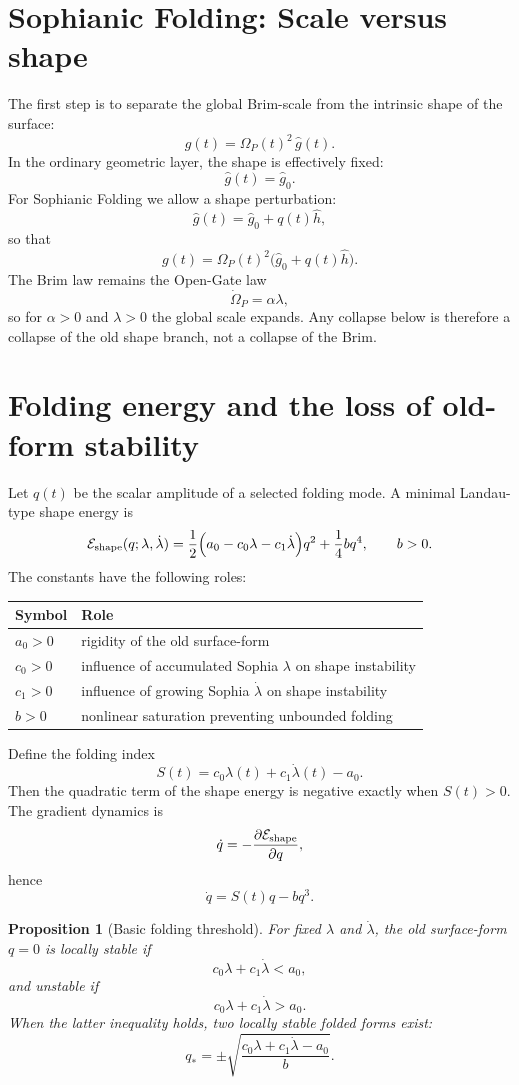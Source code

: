 \documentclass[11pt,a4paper]{article}
\newcommand{\Op}{\Omega_P}
\theoremstyle{plain}
\newtheorem{proposition}{Proposition}
\theoremstyle{remark}
\theoremstyle{definition}
\begin{document}
\section{Sophianic Folding: Scale versus shape}
The first step is to separate the global Brim-scale from the intrinsic shape of the surface:
\[
 g(t)=\Op(t)^2\,\widehat g(t).
\]
In the ordinary geometric layer, the shape is effectively fixed:
\[
 \widehat g(t)=\widehat g_0.
\]
For Sophianic Folding we allow a shape perturbation:
\[
 \widehat g(t)=\widehat g_0+q(t)\widehat h,
\]
so that
\[
\boxed{
 g(t)=\Op(t)^2\bigl(\widehat g_0+q(t)\widehat h\bigr).
}
\]
The Brim law remains the Open-Gate law
\[
\dot\Op=\alpha\lambda,
\]
so for $\alpha>0$ and $\lambda>0$ the global scale expands. Any collapse below is therefore a
collapse of the old shape branch, not a collapse of the Brim.

\section{Folding energy and the loss of old-form stability}
Let $q(t)$ be the scalar amplitude of a selected folding mode. A minimal Landau-type shape energy is
\[
\mathcal E_{\rm shape}(q;\lambda,\dot\lambda)
=
\frac12\Bigl(a_0-c_0\lambda-c_1\dot\lambda\Bigr)q^2
+
\frac14 b q^4,
\qquad b>0.
\]
The constants have the following roles:
\begin{center}
\begin{tabular}{@{}L{0.18\textwidth}L{0.68\textwidth}@{}}
\toprule
Symbol & Role \\
\midrule
$a_0>0$ & rigidity of the old surface-form \\
$c_0>0$ & influence of accumulated Sophia $\lambda$ on shape instability \\
$c_1>0$ & influence of growing Sophia $\dot\lambda$ on shape instability \\
$b>0$ & nonlinear saturation preventing unbounded folding \\
\bottomrule
\end{tabular}
\end{center}

Define the folding index
\[
\boxed{
S(t)=c_0\lambda(t)+c_1\dot\lambda(t)-a_0.
}
\]
Then the quadratic term of the shape energy is negative exactly when $S(t)>0$.
The gradient dynamics is
\[
\dot q=-\frac{\partial\mathcal E_{\rm shape}}{\partial q},
\]
hence
\[
\boxed{
\dot q=S(t)q-bq^3.
}
\]

\begin{proposition}[Basic folding threshold]
For fixed $\lambda$ and $\dot\lambda$, the old surface-form $q=0$ is locally stable if
\[
 c_0\lambda+c_1\dot\lambda<a_0,
\]
and unstable if
\[
 c_0\lambda+c_1\dot\lambda>a_0.
\]
When the latter inequality holds, two locally stable folded forms exist:
\[
\boxed{
q_\ast=\pm\sqrt{\frac{c_0\lambda+c_1\dot\lambda-a_0}{b}}.
}
\]
\end{proposition}
\end{document}
